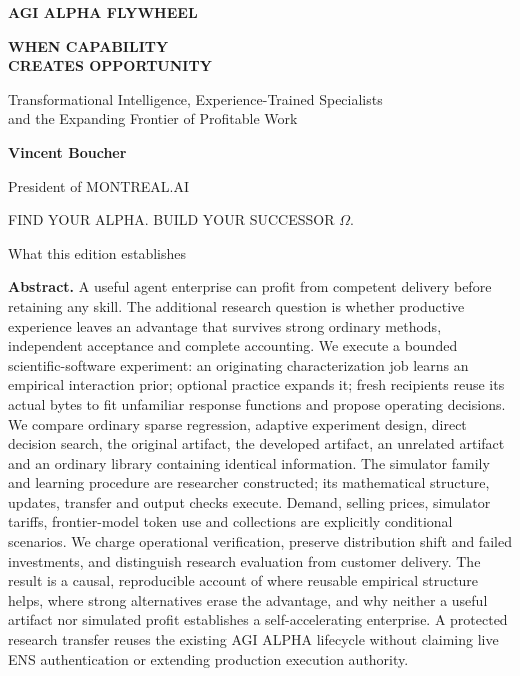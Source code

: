 \documentclass[11pt,letterpaper]{article}
\begin{document}
\begin{titlepage}
\vspace*{0.12in}
{\color{teal}\sffamily\bfseries\large AGI ALPHA FLYWHEEL}\par
\vspace{0.23in}
{\sffamily\bfseries\color{ink}\fontsize{32}{36}\selectfont WHEN CAPABILITY\\CREATES OPPORTUNITY}\par
\vspace{0.17in}
{\Large Transformational Intelligence, Experience-Trained Specialists\\[3pt] and the Expanding Frontier of Profitable Work}\par
\vspace{0.22in}
{\large\bfseries Vincent Boucher}\par
{\large President of MONTREAL.AI}\par
\vspace{0.16in}
{\sffamily\color{teal} FIND YOUR ALPHA. BUILD YOUR SUCCESSOR $\Omega$.}\par
\vspace{0.17in}
\begin{findingbox}{What this edition establishes}
\small

\end{findingbox}
\vspace{0.12in}
\begingroup\small
\textbf{Abstract.} A useful agent enterprise can profit from competent delivery before retaining any skill. The additional research question is whether productive experience leaves an advantage that survives strong ordinary methods, independent acceptance and complete accounting. We execute a bounded scientific-software experiment: an originating characterization job learns an empirical interaction prior; optional practice expands it; fresh recipients reuse its actual bytes to fit unfamiliar response functions and propose operating decisions. We compare ordinary sparse regression, adaptive experiment design, direct decision search, the original artifact, the developed artifact, an unrelated artifact and an ordinary library containing identical information. The simulator family and learning procedure are researcher constructed; its mathematical structure, updates, transfer and output checks execute. Demand, selling prices, simulator tariffs, frontier-model token use and collections are explicitly conditional scenarios. We charge operational verification, preserve distribution shift and failed investments, and distinguish research evaluation from customer delivery. The result is a causal, reproducible account of where reusable empirical structure helps, where strong alternatives erase the advantage, and why neither a useful artifact nor simulated profit establishes a self-accelerating enterprise. A protected research transfer reuses the existing AGI ALPHA lifecycle without claiming live ENS authentication or extending production execution authority.\par

\end{titlepage}
\end{document}
